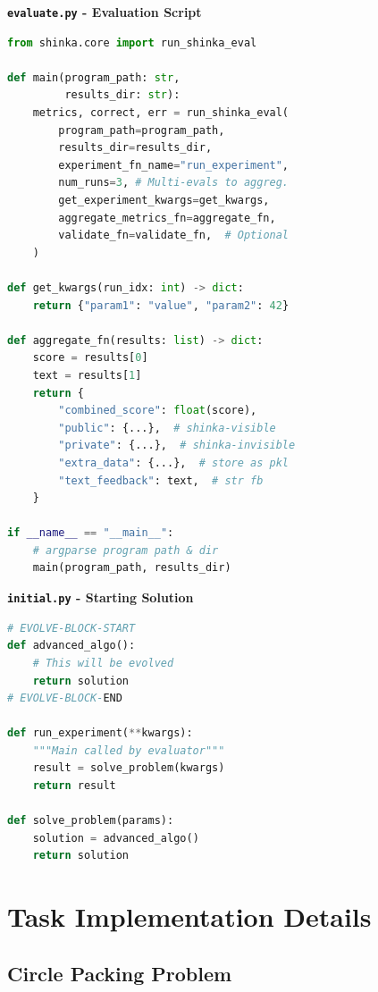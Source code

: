 \begin{minipage}{0.45\textwidth}
\textbf{\texttt{evaluate.py} - Evaluation Script}

\begin{lstlisting}[language=Python, basicstyle=\ttfamily\tiny]
from shinka.core import run_shinka_eval

def main(program_path: str,
         results_dir: str):
    metrics, correct, err = run_shinka_eval(
        program_path=program_path,
        results_dir=results_dir,
        experiment_fn_name="run_experiment",
        num_runs=3, # Multi-evals to aggreg.
        get_experiment_kwargs=get_kwargs,
        aggregate_metrics_fn=aggregate_fn,
        validate_fn=validate_fn,  # Optional
    )

def get_kwargs(run_idx: int) -> dict:
    return {"param1": "value", "param2": 42}

def aggregate_fn(results: list) -> dict:
    score = results[0]
    text = results[1]
    return {
        "combined_score": float(score),
        "public": {...},  # shinka-visible
        "private": {...},  # shinka-invisible
        "extra_data": {...},  # store as pkl
        "text_feedback": text,  # str fb
    }

if __name__ == "__main__":
    # argparse program path & dir
    main(program_path, results_dir)
\end{lstlisting}
\end{minipage}
\hfill
\begin{minipage}{0.45\textwidth}
\textbf{\texttt{initial.py} - Starting Solution}

\begin{lstlisting}[language=Python, basicstyle=\ttfamily\tiny]
# EVOLVE-BLOCK-START
def advanced_algo():
    # This will be evolved
    return solution
# EVOLVE-BLOCK-END

def run_experiment(**kwargs):
    """Main called by evaluator"""
    result = solve_problem(kwargs)
    return result

def solve_problem(params):
    solution = advanced_algo()
    return solution
\end{lstlisting}
\end{minipage}



\clearpage
\section{Task Implementation Details}
\label{appsec:implememtation}
\subsection{Circle Packing Problem}

